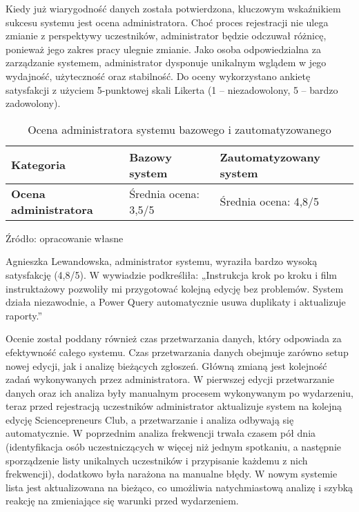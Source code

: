 Kiedy już wiarygodność danych została potwierdzona, kluczowym wskaźnikiem sukcesu systemu jest ocena administratora. Choć proces rejestracji nie ulega zmianie z perspektywy uczestników, administrator będzie odczuwał  różnicę, ponieważ jego zakres pracy ulegnie zmianie. Jako osoba odpowiedzialna za zarządzanie systemem, administrator dysponuje unikalnym wglądem w jego wydajność, użyteczność oraz stabilność. Do oceny wykorzystano ankietę satysfakcji z użyciem 5-punktowej skali Likerta (1 – niezadowolony, 5 – bardzo zadowolony).

\begin{table}[ht]
    \centering
    \renewcommand{\arraystretch}{1.3} %
    \caption[Ocena administratora systemu bazowego i zautomatyzowanego, źródło: opracowanie własne]{Ocena administratora systemu bazowego i zautomatyzowanego}
    \begin{tabular}{| p{4cm} | p{5cm} | p{5cm} |}
        \hline
        \textbf{Kategoria} & \textbf{Bazowy system} & \textbf{Zautomatyzowany system} \\
        \hline
        \textbf{Ocena administratora} & Średnia ocena: 3,5/5 & Średnia ocena: 4,8/5 \\
        \hline
    \end{tabular}
    \vspace{0.5em}
    \par\raggedright\footnotesize{Źródło: opracowanie własne}
\end{table}

Agnieszka Lewandowska, administrator systemu, wyraziła bardzo wysoką satysfakcję (4,8/5). W wywiadzie podkreśliła: „Instrukcja krok po kroku i film instruktażowy pozwoliły mi przygotować kolejną edycję bez problemów. System działa niezawodnie, a Power Query automatycznie usuwa duplikaty i aktualizuje raporty.”

Ocenie został poddany również czas przetwarzania danych, który odpowiada za efektywność całego systemu. Czas przetwarzania danych obejmuje zarówno setup nowej edycji, jak i analizę bieżących zgłoszeń. Główną zmianą jest kolejność zadań wykonywanych przez administratora. W pierwszej edycji przetwarzanie danych oraz ich analiza były manualnym procesem wykonywanym po wydarzeniu, teraz przed rejestracją uczestników administrator aktualizuje system na kolejną edycję Sciencepreneurs Club, a przetwarzanie i analiza odbywają się automatycznie. W poprzednim analiza frekwencji trwała czasem pół dnia (identyfikacja osób uczestniczących w więcej niż jednym spotkaniu, a następnie sporządzenie listy unikalnych uczestników i przypisanie każdemu z nich frekwencji), dodatkowo była narażona na manualne błędy. W nowym systemie lista jest aktualizowana na bieżąco, co umożliwia natychmiastową analizę i szybką reakcję na zmieniające się warunki przed wydarzeniem. 

